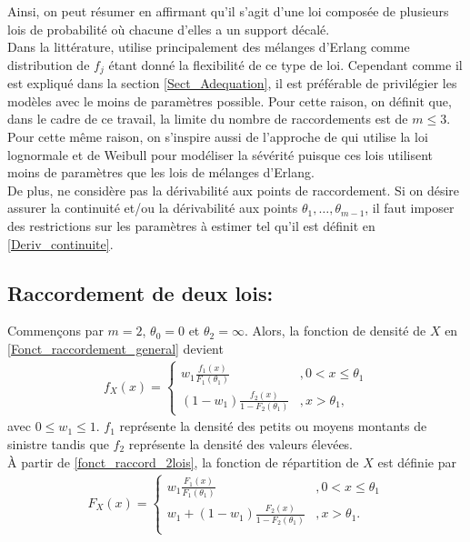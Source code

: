  	Ainsi, on peut résumer en affirmant qu'il s'agit d'une loi composée de plusieurs lois de probabilité où chacune d'elles a un support décalé.\\
	
	Dans la littérature, \cite{albrecher2017reinsurance} utilise principalement des mélanges d'Erlang comme distribution de $f_j$ étant donné la flexibilité de ce type de loi. Cependant  comme il est expliqué dans la section \ref{Sect_Adequation}, il est préférable de privilégier les modèles avec le moins de paramètres possible. Pour cette raison, on définit que, dans le cadre de ce travail, la limite du nombre de raccordements est de $m\leq 3$. \\ 
	
	Pour cette même raison, on s'inspire aussi de l'approche de \cite{brazauskas2016modeling} qui utilise la loi lognormale et de Weibull pour modéliser la sévérité puisque ces lois utilisent moins de paramètres que les lois de mélanges d'Erlang.\\
	
	De plus, \cite{albrecher2017reinsurance} ne considère pas la dérivabilité aux points de raccordement. Si on désire assurer la continuité et/ou la dérivabilité aux points $\theta_1,\dots, \theta_{m-1}$, il faut imposer des restrictions sur les paramètres à estimer tel qu'il est définit en \ref{Deriv_continuite}.
	
	\subsection{Raccordement de deux lois:} Commençons par $m=2$, $\theta_0=0$ et $\theta_2 = \infty$. Alors, la fonction de densité de $X$ en \ref{Fonct_raccordement_general} devient
	\begin{align}\label{fonct_raccord_2lois}
		f_X(x) = \left\{
		\begin{array}{ll}
			w_1 \frac{f_1(x)}{F_1(\theta_1)} & ,0 < x \leq \theta_1 \\
			(1-w_1) \frac{f_2(x)}{1-F_2(\theta_1)} & ,x>\theta_1,  
		\end{array}
		\right.
	\end{align}
	avec $0\leq w_1 \leq 1$. $f_1$ représente la densité des petits ou moyens montants de sinistre tandis que $f_2$ représente la densité des valeurs élevées.\\
	
	À partir de \ref{fonct_raccord_2lois}, la fonction de répartition de $X$ est définie par
	\begin{align}\label{Fct_rep_2lois}
		F_X(x) = \left\{
		\begin{array}{ll}
			w_1 \frac{F_1(x)}{F_1(\theta_1)} & ,0 < x \leq \theta_1 \\
			w_1 + (1-w_1) \frac{F_2(x)}{1-F_2(\theta_1)} & ,x > \theta_1.  \\
		\end{array}
		\right.
	\end{align}
	
